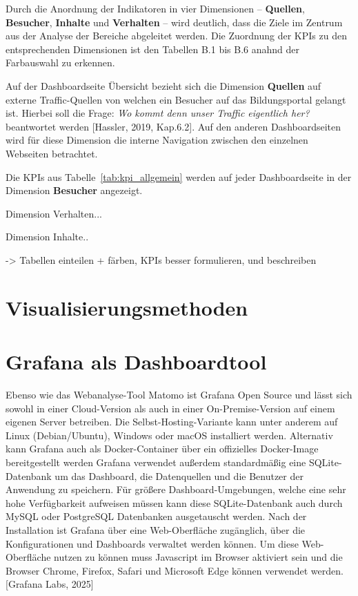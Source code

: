 Durch die Anordnung der Indikatoren in vier Dimensionen – \textbf{Quellen}, \textbf{Besucher}, \textbf{Inhalte} und \textbf{Verhalten} – wird deutlich, dass die Ziele im Zentrum aus der Analyse der Bereiche abgeleitet werden. Die Zuordnung der KPIs zu den entsprechenden Dimensionen ist den Tabellen B.1 bis B.6 anahnd der Farbauswahl zu erkennen.

Auf der Dashboardseite \glqq Übersicht\grqq{} bezieht sich die Dimension \textbf{Quellen} auf externe Traffic-Quellen von welchen ein Besucher auf das Bildungsportal gelangt ist. Hierbei soll die Frage: \textit{\glqq Wo kommt denn unser Traffic eigentlich her?\grqq{}} beantwortet werden [Hassler, 2019, Kap.6.2]. Auf den anderen Dashboardseiten wird für diese Dimension die interne Navigation zwischen den einzelnen Webseiten betrachtet. 

Die KPIs aus Tabelle~\ref{tab:kpi_allgemein} werden auf jeder Dashboardseite in der Dimension \textbf{Besucher} angezeigt.


Dimension Verhalten...

Dimension Inhalte..


-> Tabellen einteilen + färben, KPIs besser formulieren, und beschreiben

\section{Visualisierungsmethoden}

\section{Grafana als Dashboardtool}
Ebenso wie das Webanalyse-Tool Matomo ist Grafana Open Source und lässt sich sowohl in einer Cloud-Version als auch in einer On-Premise-Version auf einem eigenen Server betreiben. Die Selbst-Hosting-Variante kann unter anderem auf Linux (Debian/Ubuntu), Windows oder macOS installiert werden. Alternativ kann Grafana auch als Docker-Container über ein offizielles Docker-Image bereitgestellt werden Grafana verwendet außerdem standardmäßig eine SQLite-Datenbank um das Dashboard, die Datenquellen und die Benutzer der Anwendung zu speichern. Für größere Dashboard-Umgebungen, welche eine sehr hohe Verfügbarkeit aufweisen müssen kann diese SQLite-Datenbank auch durch MySQL oder PostgreSQL Datenbanken ausgetauscht werden. Nach der Installation ist Grafana über eine Web-Oberfläche zugänglich, über die Konfigurationen und Dashboards verwaltet werden können. Um diese Web-Oberfläche nutzen zu können muss Javascript im Browser aktiviert sein und die Browser Chrome, Firefox, Safari und Microsoft Edge können verwendet werden. [Grafana Labs, 2025]

